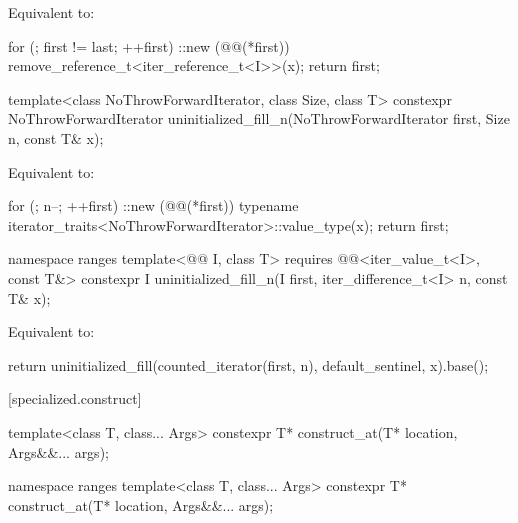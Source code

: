 \begin{itemdescr}
\pnum
\effects
Equivalent to:
\begin{codeblock}
for (; first != last; ++first)
  ::new (@@(*first)) remove_reference_t<iter_reference_t<I>>(x);
return first;
\end{codeblock}
\end{itemdescr}

%
\begin{itemdecl}
template<class NoThrowForwardIterator, class Size, class T>
  constexpr NoThrowForwardIterator
    uninitialized_fill_n(NoThrowForwardIterator first, Size n, const T& x);
\end{itemdecl}

\begin{itemdescr}
\pnum
\effects
Equivalent to:
\begin{codeblock}
for (; n--; ++first)
  ::new (@@(*first))
    typename iterator_traits<NoThrowForwardIterator>::value_type(x);
return first;
\end{codeblock}
\end{itemdescr}

%
\begin{itemdecl}
namespace ranges {
  template<@@ I, class T>
    requires @@<iter_value_t<I>, const T&>
    constexpr I uninitialized_fill_n(I first, iter_difference_t<I> n, const T& x);
}
\end{itemdecl}

\begin{itemdescr}
\pnum
\effects
Equivalent to:
\begin{codeblock}
return uninitialized_fill(counted_iterator(first, n), default_sentinel, x).base();
\end{codeblock}
\end{itemdescr}

[specialized.construct]{}

\begin{itemdecl}
template<class T, class... Args>
  constexpr T* construct_at(T* location, Args&&... args);

namespace ranges {
  template<class T, class... Args>
    constexpr T* construct_at(T* location, Args&&... args);
}
\end{itemdecl}

